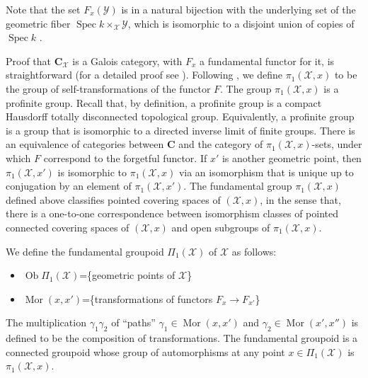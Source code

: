 \documentclass{amsart}
\theoremstyle{definition}
\theoremstyle{remark}
\theoremstyle{remark}
\newcommand{\X}{\mathcal{X}}
\newcommand{\Y}{\mathcal{Y}}
\newcommand{\PX}{\Pi_1(\X)}
\newcommand{\pX}{\pi_1(\X,x)}
\newcommand{\Spec}{\operatorname{Spec}}
\newcommand{\Ob}{\operatorname{Ob}}
\newcommand{\Mor}{\operatorname{Mor}}
\begin{document}
\noindent Note that the set $F_x(\Y)$ is in a natural bijection
with the underlying set of the geometric fiber $\Spec k
\times_{\X} \Y$, which is isomorphic to a disjoint union of copies
of $\Spec k$ .

Proof that  $\mathbf{C}_{\X}$ is a Galois category, with  $F_x$  a
fundamental functor for it, is straightforward (for a detailed
proof see \cite{Noohi}). Following \cite{SGA1}, we define $\pX$ to
be the group of self-transformations of the functor $F$. The group
$\pX$ is a profinite group. Recall that, by definition, a
profinite group is a compact Hausdorff totally disconnected
topological group. Equivalently, a profinite group is a group that
is isomorphic to a directed inverse limit of finite groups. There
is an equivalence of categories between $\mathbf{C}$ and the
category of $\pX$-sets, under which $F$ correspond to the
forgetful functor. If $x'$ is another geometric point, then
$\pi_1(\X,x')$ is isomorphic to $\pX$ via an isomorphism that is
unique up to conjugation by an element of $\pi_1(\X,x')$. The
fundamental group $\pX$ defined above classifies pointed covering
spaces of $(\X,x)$, in the sense that, there is a one-to-one
correspondence between isomorphism classes of pointed connected
covering spaces of $(\X,x)$ and open subgroups of $\pX$.

We define the fundamental groupoid $\PX$ of $\X$ as follows:

\begin{itemize}
\item $\Ob \PX$=\{geometric points of $\X$\}

\item $\Mor(x,x')$=\{transformations of functors $F_x \to F_{x'}$\}
\end{itemize}

\noindent The multiplication $\gamma_1 \gamma_2$ of ``paths''
$\gamma_1 \in \Mor(x,x')$ and $\gamma_2 \in \Mor(x',x'')$ is
defined to be the composition of transformations. The fundamental
groupoid is a connected groupoid whose group of automorphisms at
any point $x \in \PX$ is $\pX$.
\end{document}
